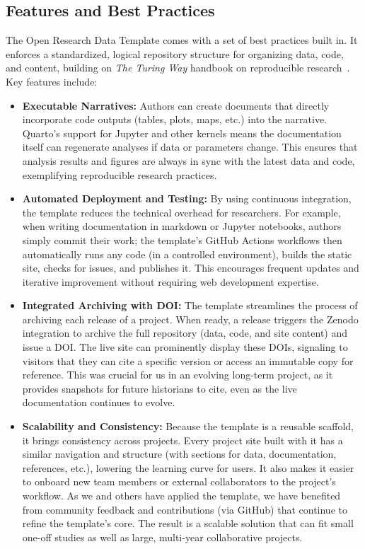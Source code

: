 \documentclass[final]{anthology-ch} %
\begin{document}
\subsection{Features and Best Practices}\label{features-and-best-practices}

The Open Research Data Template comes with a set of best practices built in. It enforces a standardized, logical repository structure for organizing data, code, and content, building on \emph{The Turing Way} handbook on reproducible research~\cite{theturingwaycommunity2025}. Key features include:

\begin{itemize}
\tightlist
\item
  \textbf{Executable Narratives:} Authors can create documents that directly incorporate code outputs (tables, plots, maps, etc.) into the narrative. Quarto's support for Jupyter and other kernels means the documentation itself can regenerate analyses if data or parameters change. This ensures that analysis results and figures are always in sync with the latest data and code, exemplifying reproducible research practices.\\
\item
  \textbf{Automated Deployment and Testing:} By using continuous integration, the template reduces the technical overhead for researchers. For example, when writing documentation in markdown or Jupyter notebooks, authors simply commit their work; the template's GitHub Actions workflows then automatically runs any code (in a controlled environment), builds the static site, checks for issues, and publishes it. This encourages frequent updates and iterative improvement without requiring web development expertise.\\
\item
  \textbf{Integrated Archiving with DOI:} The template streamlines the process of archiving each release of a project. When ready, a release triggers the Zenodo integration to archive the full repository (data, code, and site content) and issue a DOI. The live site can prominently display these DOIs, signaling to visitors that they can cite a specific version or access an immutable copy for reference. This was crucial for us in an evolving long-term project, as it provides snapshots for future historians to cite, even as the live documentation continues to evolve.\\
\item
  \textbf{Scalability and Consistency:} Because the template is a reusable scaffold, it brings consistency across projects. Every project site built with it has a similar navigation and structure (with sections for data, documentation, references, etc.), lowering the learning curve for users. It also makes it easier to onboard new team members or external collaborators to the project's workflow. As we and others have applied the template, we have benefited from community feedback and contributions (via GitHub) that continue to refine the template's core. The result is a scalable solution that can fit small one-off studies as well as large, multi-year collaborative projects.
\end{itemize}
\end{document}
